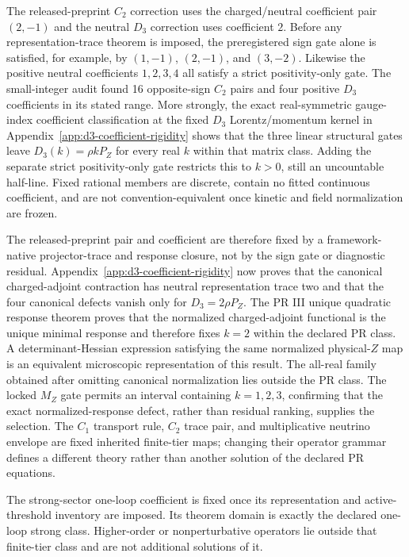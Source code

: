 The released-preprint $C_2$ correction uses the charged/neutral coefficient pair $(2,-1)$ and the neutral $D_3$ correction uses coefficient $2$.  Before any representation-trace theorem is imposed, the preregistered sign gate alone is satisfied, for example, by $(1,-1)$, $(2,-1)$, and $(3,-2)$.  Likewise the positive neutral coefficients $1,2,3,4$ all satisfy a strict positivity-only gate.
The small-integer audit found 16 opposite-sign $C_2$ pairs and four positive $D_3$ coefficients in its stated range.  More strongly, the exact real-symmetric gauge-index coefficient classification at the fixed $D_3$ Lorentz/momentum kernel in Appendix~\ref{app:d3-coefficient-rigidity} shows that the three linear structural gates leave $D_3(k)=\rho kP_Z$ for every real $k$ within that matrix class.  Adding the separate strict positivity-only gate restricts this to $k>0$, still an uncountable half-line.  Fixed rational members are discrete, contain no fitted continuous coefficient, and are not convention-equivalent once kinetic and field normalization are frozen.

The released-preprint pair and coefficient are therefore fixed by a framework-native projector-trace and response closure, not by the sign gate or diagnostic residual.  Appendix~\ref{app:d3-coefficient-rigidity} now proves that the canonical charged-adjoint contraction has neutral representation trace two and that the four canonical defects vanish only for $D_3=2\rho P_Z$. The PR III unique quadratic response theorem proves that the normalized charged-adjoint functional is the unique minimal response and therefore fixes $k=2$ within the declared PR class.  A determinant-Hessian expression satisfying the same normalized physical-$Z$ map is an equivalent microscopic representation of this result.  The all-real family obtained after omitting canonical normalization lies outside the PR class.  The locked $M_Z$ gate
permits an interval containing $k=1,2,3$, confirming that the exact normalized-response defect, rather than residual ranking, supplies the selection.  The $C_1$ transport rule, $C_2$ trace pair, and multiplicative neutrino envelope are fixed inherited finite-tier maps; changing their operator grammar defines a different theory rather than another solution of the declared PR equations.

The strong-sector one-loop coefficient is fixed once its representation and active-threshold inventory are imposed.  Its theorem domain is exactly the declared one-loop strong class.  Higher-order or nonperturbative operators lie outside that finite-tier class and are not additional solutions of it.